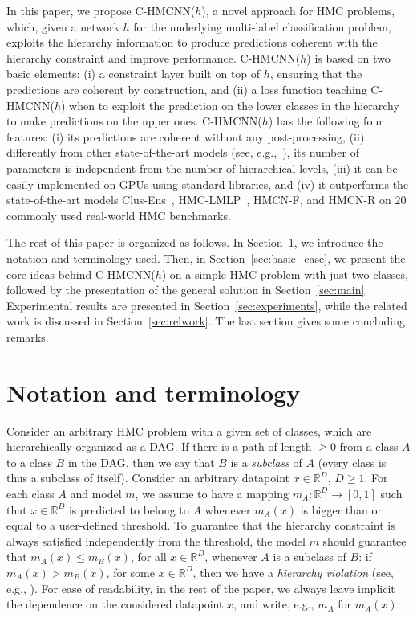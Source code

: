 \documentclass{article}
\newcommand{\system}[1]{C-HMCNN(#1)}
\newcommand{\lmlp}{{HMC-LMLP}}
\newcommand{\ens}{{Clus-Ens}}
\newcommand{\hmcnf}{{HMCN-F}}
\newcommand{\hmcnr}{{HMCN-R}}
\begin{document}
In this paper, we propose \system{$h$}, a novel approach for HMC problems, which, given a network $h$ for the underlying multi-label classification problem, exploits the hierarchy information to produce  predictions coherent with the hierarchy constraint and improve performance. 
\system{$h$} is
based on two basic elements: 
(i) a constraint layer built on top of $h$,  ensuring that the predictions are coherent by construction,
 and (ii) a loss function teaching \system{$h$}
 when to exploit the prediction on the lower classes in the hierarchy to make predictions on the upper ones.  
\system{$h$} has the following four features: (i) its predictions are coherent without any post-processing, (ii) differently from other state-of-the-art models (see, e.g.,~\cite{cerri2018}), its number of parameters is independent from the number of hierarchical levels, (iii)  it can be easily implemented on GPUs using standard libraries, and (iv) it outperforms the state-of-the-art models {\ens}~\citep{schietgat2010}, {\lmlp}~\citep{cerri2016}, {\hmcnf}, and {\hmcnr} \citep{cerri2018} on 20 commonly used real-world HMC benchmarks.
 








The rest of this paper is organized as follows. 
In Section~\ref{sec:terminology}, we introduce the notation and terminology used. 
Then, in Section~\ref{sec:basic_case}, we present the core ideas behind \system{$h$} on a simple HMC problem 
with just two classes, followed by the presentation of the general solution in Section~\ref{sec:main}. Experimental results are presented in Section~\ref{sec:experiments}, while the related work is discussed in Section~\ref{sec:relwork}. The last section gives some concluding remarks. 

\section{Notation and terminology}\label{sec:terminology}

Consider an arbitrary HMC problem with a given set of classes, which are hierarchically organized as a DAG. If there is a path of length $\geq 0$ from a class $A$ to a class $B$ in the DAG, then we say that $B$ is a {\sl subclass} of $A$ (every class is thus a subclass of itself).  Consider an arbitrary datapoint $x \in \mathbb{R}^D$, $D\geq 1$. 
For each class $A$ and model $m$, we assume to have a mapping $m_A\colon \mathbb{R}^D \to [0,1]$ such that $x \in \mathbb{R}^D$ is predicted to belong to $A$ whenever 
$m_A(x)$ is bigger than or equal to a user-defined threshold. To guarantee that the hierarchy constraint is always satisfied independently from the threshold, the model $m$ should guarantee that $m_A(x) \leq m_B(x)$, for all  $x \in \mathbb{R}^D$, whenever $A$ is a subclass of $B$: if $m_A(x) > m_B(x)$, for some $x \in \mathbb{R}^D$, then we have a {\sl hierarchy violation} (see, e.g., \citep{cerri2018}). 
For ease of readability,  
in the rest of the paper, we always leave implicit the dependence on the considered datapoint $x$,
and write, e.g., $m_A$ for $m_A(x)$.
\end{document}
